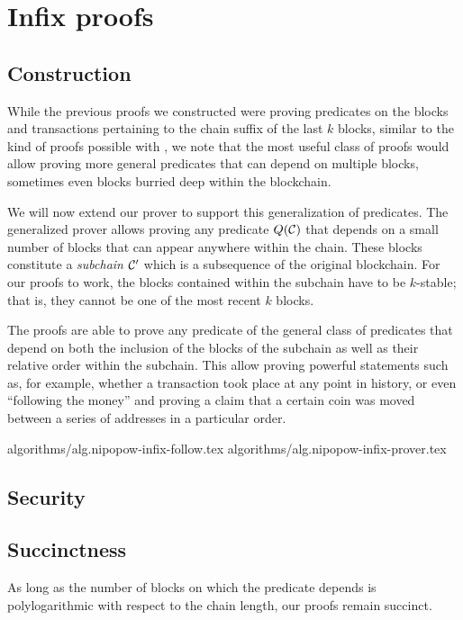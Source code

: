\section{Infix proofs}

\subsection{Construction}

While the previous proofs we constructed were proving predicates on the blocks
and transactions pertaining to the chain suffix of the last $k$ blocks, similar
to the kind of proofs possible with \cite{KLS}, we note that the most useful
class of proofs would allow proving more general predicates that can depend on
multiple blocks, sometimes even blocks burried deep within the blockchain.

We will now extend our prover to support this generalization of predicates. The
generalized prover allows proving any predicate $Q(\mathcal{C})$ that depends on a
small number of blocks that can appear anywhere within the chain. These blocks
constitute a \textit{subchain} $\mathcal{C}'$ which is a subsequence of the original
blockchain. For our proofs to work, the blocks contained within the subchain
have to be $k$-stable; that is, they cannot be one of the most recent $k$
blocks.

The proofs are able to prove any predicate of the general class of predicates
that depend on both the inclusion of the blocks of the subchain as well as
their relative order within the subchain. This allow proving powerful
statements such as, for example, whether a transaction took place at any point
in history, or even ``following the money'' and proving a claim that a certain
coin was moved between a series of addresses in a particular order.

{algorithms/alg.nipopow-infix-follow.tex}
{algorithms/alg.nipopow-infix-prover.tex}

\subsection{Security}

\subsection{Succinctness}
As long as the number of blocks on which the predicate depends is
polylogarithmic with respect to the chain length, our proofs remain succinct.
